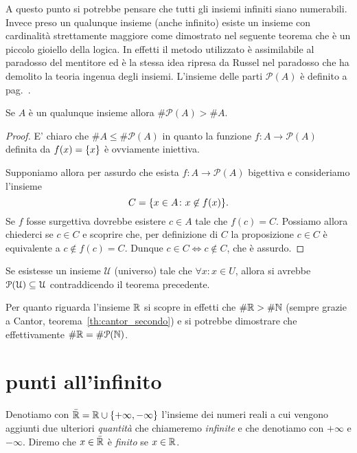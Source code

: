 A questo punto si potrebbe pensare che
tutti gli insiemi infiniti siano numerabili.
Invece preso un qualunque insieme (anche infinito)
esiste un insieme con cardinalità strettamente maggiore
come dimostrato nel seguente teorema che è un piccolo gioiello della logica.
In effetti il metodo utilizzato è assimilabile al paradosso del mentitore 
ed è la stessa idea ripresa da Russel nel paradosso che ha demolito la teoria 
ingenua degli insiemi.
L'insieme delle parti $\mathcal P(A)$ è definito a pag.~\pageref{def:insieme_parti}.
%
\begin{theorem}[Cantor]%
\label{th:Cantor}%
  Se $A$ è un qualunque insieme allora $\# \mathcal P(A) > \# A$.
\end{theorem}
%
\begin{proof}
  E' chiaro che $\# A \le \#\mathcal P(A)$ in quanto 
  la funzione $f\colon A \to \mathcal P(A)$ definita da $f(x)=\ENCLOSE{x}$
  è ovviamente iniettiva.

  Supponiamo allora per assurdo che esista $f\colon A\to \mathcal P(A)$
  bigettiva e consideriamo l'insieme 
  \[
    C = \ENCLOSE{x\in A \colon x\not\in f(x)}.  
  \]
  Se $f$ fosse surgettiva dovrebbe esistere $c\in A$ tale che $f(c) = C$.
  Possiamo allora chiederci se $c\in C$ e scoprire che, 
  per definizione di $C$ la proposizione $c\in C$ è equivalente 
  a $c\not\in f(c) = C$. 
  Dunque $c\in C \iff c\not\in C$, che è assurdo.
\end{proof}
%
\begin{corollary}
  Se esistesse un insieme $\mathcal U$ (universo) 
  tale che $\forall x\colon x \in U$, allora 
  si avrebbe $\mathcal \P(\mathcal U) \subset \mathcal U$
  contraddicendo il teorema precedente.
\end{corollary}
%
Per quanto riguarda l'insieme $\RR$ si
scopre in effetti che $\#\RR > \#\NN$
(sempre grazie a Cantor, teorema~\ref{th:cantor_secondo})
e si potrebbe dimostrare che effettivamente $\#\RR = \#\mathcal P(\NN)$.

\section{punti all'infinito}
\label{sec:reali_estesi}

\begin{definition}
\mymargin{$\bar{\RR}$}
Denotiamo con $\bar \RR=\RR \cup \ENCLOSE{+\infty, -\infty}$ l'insieme dei numeri reali
\mymargin{$+\infty$, $-\infty$}
a cui vengono aggiunti due ulteriori \emph{quantità} che chiameremo
\emph{infinite} e che denotiamo con $+\infty$ e $-\infty$.
Diremo che $x\in \bar \RR$ è \emph{finito} se $x\in \RR$.
\end{definition}


